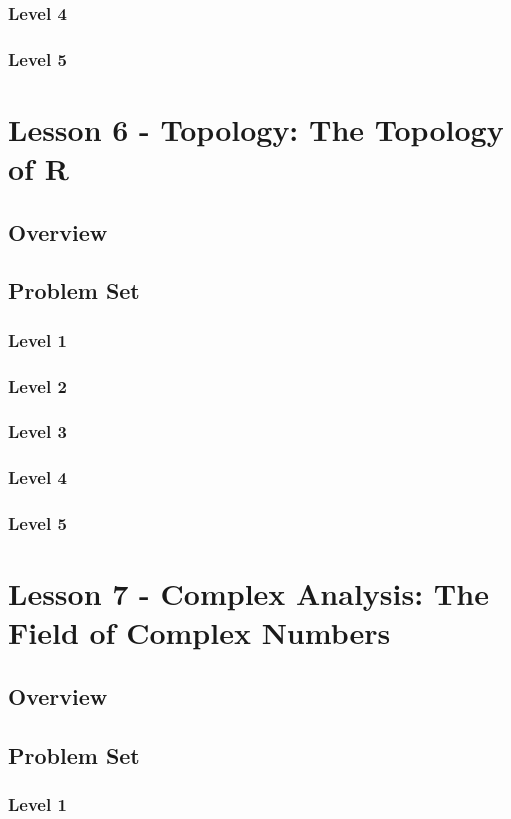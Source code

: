 \documentclass{article}
\begin{document}
\subsubsection{Level 4}
\subsubsection{Level 5}
\pagebreak

\section{Lesson 6 - Topology: The Topology of R}
\subsection{Overview}
\subsection{Problem Set}
\subsubsection{Level 1}
\subsubsection{Level 2}
\subsubsection{Level 3}
\subsubsection{Level 4}
\subsubsection{Level 5}
\pagebreak

\section{Lesson 7 - Complex Analysis: The Field of Complex Numbers}
\subsection{Overview}
\subsection{Problem Set}
\subsubsection{Level 1}
\end{document}
